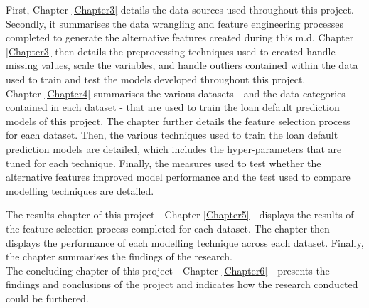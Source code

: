 First, Chapter \ref{Chapter3} details the data sources used throughout this project. Secondly, it summarises the data wrangling and feature engineering processes completed to generate the alternative features created during this m.d. Chapter \ref{Chapter3} then details the preprocessing techniques used to created handle missing values, scale the variables, and handle outliers contained within the data used to train and test the models developed throughout this project. \\

Chapter \ref{Chapter4} summarises the various datasets - and the data categories contained in each dataset - that are used to train the loan default prediction models of this project. The chapter further details the feature selection process for each dataset. Then, the various techniques used to train the loan default prediction models are detailed, which includes the hyper-parameters that are tuned for each technique. Finally, the measures used to test whether the alternative features improved model performance and the test used to compare modelling techniques are detailed.  \newpage

The results chapter of this project - Chapter \ref{Chapter5} - displays the results of the feature selection process completed for each dataset. The chapter then displays the performance of each modelling technique across each dataset. Finally, the chapter summarises the findings of the research. \\

The concluding chapter of this project - Chapter \ref{Chapter6} - presents the findings and conclusions of the project and indicates how the research conducted could be furthered.  


